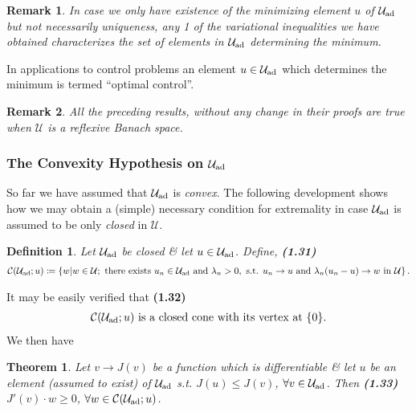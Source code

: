 \documentclass[oneside]{book}
\numberwithin{equation}{section}
\newtheorem{definition}{Definition}[chapter]
\newtheorem{remark}{Remark}[chapter]
\newtheorem{theorem}{Theorem}[chapter]
\begin{document}
\begin{remark}
	In case we only have existence of the minimizing element $u$ of $\mathcal{U}_{\rm ad}$ but not necessarily uniqueness, any 1 of the variational inequalities we have obtained characterizes the set of elements in $\mathcal{U}_{\rm ad}$ determining the minimum.
\end{remark}
In applications to control problems an element $u\in\mathcal{U}_{\rm ad}$ which determines the minimum is termed ``optimal control''.

\begin{remark}
	All the preceding results, without any change in their proofs are true when $\mathcal{U}$ is a reflexive Banach space.
\end{remark}

\subsubsection{The Convexity Hypothesis on $\mathcal{U}_{\rm ad}$}
So far we have assumed that $\mathcal{U}_{\rm ad}$ is \textit{convex}. The following development shows how we may obtain a (simple) necessary condition for extremality in case $\mathcal{U}_{\rm ad}$ is assumed to be only \textit{closed} in $\mathcal{U}$.

\begin{definition}
	Let $\mathcal{U}_{\rm ad}$ be closed \& let $u\in\mathcal{U}_{\rm ad}$. Define, \textbf{(1.31)}
	\begin{align*}
		\mathcal{C}(\mathcal{U}_{\rm ad};u)\coloneqq\left\{w|w\in\mathcal{U};\mbox{ there exists } u_n\in\mathcal{U}_{\rm ad}\mbox{ and }\lambda_n > 0,\mbox{ s.t. } u_n\to u\mbox{ and }\lambda_n(u_n - u)\to w\mbox{ in }\mathcal{U}\right\}.
	\end{align*}
\end{definition}
It may be easily verified that \textbf{(1.32)}
\begin{align*}
	\mathcal{C}(\mathcal{U}_{\rm ad};u)\mbox{ is a closed cone with its vertex at }\{0\}.
\end{align*}
We then have

\begin{theorem}
	Let $v\to J(v)$ be a function which is differentiable \& let $u$ be an element (assumed to exist) of $\mathcal{U}_{\rm ad}$ s.t. $J(u)\le J(v)$, $\forall v\in\mathcal{U}_{\rm ad}$. Then \textbf{(1.33)} $J'(v)\cdot w\ge 0$, $\forall w\in\mathcal{C}(\mathcal{U}_{\rm ad};u)$.
\end{theorem}
\end{document}

